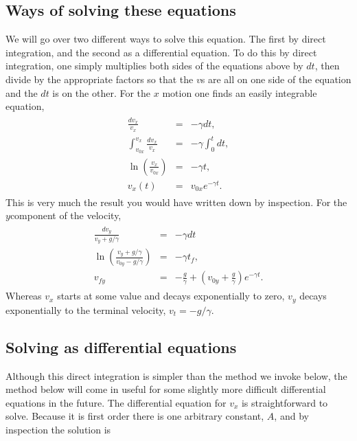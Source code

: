 \documentclass[letterpaper,10pt,english]{sphinxmanual}
\begin{document}
\subsection{Ways of solving these equations}
\label{\detokenize{chapter2:ways-of-solving-these-equations}}
We will go over two different ways to solve this equation. The first
by direct integration, and the second as a differential equation. To
do this by direct integration, one simply multiplies both sides of the
equations above by \(dt\), then divide by the appropriate factors so
that the \(v\)s are all on one side of the equation and the \(dt\) is on
the other. For the \(x\) motion one finds an easily integrable equation,
\begin{equation*}
\begin{split}
\begin{eqnarray}
\frac{dv_x}{v_x}&=&-\gamma dt,\\
\nonumber
\int_{v_{0x}}^{v_{x}}\frac{dv_x}{v_x}&=&-\gamma\int_0^{t}dt,\\
\nonumber
\ln\left(\frac{v_{x}}{v_{0x}}\right)&=&-\gamma t,\\
\nonumber
v_{x}(t)&=&v_{0x}e^{-\gamma t}.
\end{eqnarray}
\end{split}
\end{equation*}
This is very much the result you would have written down
by inspection. For the \(y\)\sphinxhyphen{}component of the velocity,
\begin{equation*}
\begin{split}
\begin{eqnarray}
\frac{dv_y}{v_y+g/\gamma}&=&-\gamma dt\\
\nonumber
\ln\left(\frac{v_{y}+g/\gamma}{v_{0y}-g/\gamma}\right)&=&-\gamma t_f,\\
\nonumber
v_{fy}&=&-\frac{g}{\gamma}+\left(v_{0y}+\frac{g}{\gamma}\right)e^{-\gamma t}.
\end{eqnarray}
\end{split}
\end{equation*}
Whereas \(v_x\) starts at some value and decays
exponentially to zero, \(v_y\) decays exponentially to the terminal
velocity, \(v_t=-g/\gamma\).


\subsection{Solving as differential equations}
\label{\detokenize{chapter2:solving-as-differential-equations}}
Although this direct integration is simpler than the method we invoke
below, the method below will come in useful for some slightly more
difficult differential equations in the future. The differential
equation for \(v_x\) is straight\sphinxhyphen{}forward to solve. Because it is first
order there is one arbitrary constant, \(A\), and by inspection the
solution is
\end{document}
